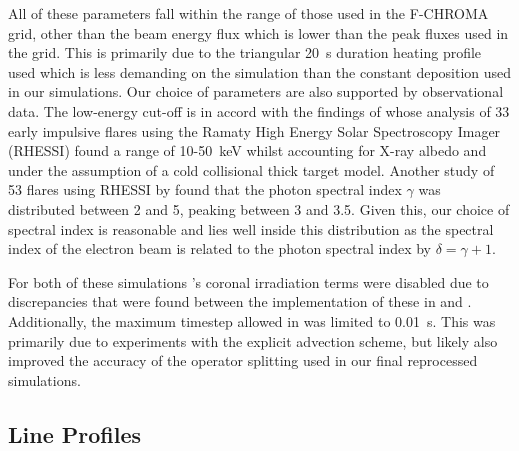 All of these parameters fall within the range of those used in the F-CHROMA grid, other than the beam energy flux which is lower than the peak fluxes used in the grid.
This is primarily due to the triangular \SI{20}{\second} duration heating profile used which is less demanding on the simulation than the constant deposition used in our simulations.
Our choice of parameters are also supported by observational data.
The low-energy cut-off is in accord with the findings of \citet{Sui2007} whose analysis of 33 early impulsive flares using the Ramaty High Energy Solar Spectroscopy Imager (RHESSI) found a range of 10-\SI{50}{\kilo\electronvolt} whilst accounting for X-ray albedo and under the assumption of a cold collisional thick target model.
Another study of 53 flares using RHESSI by \citet{Saint-Hilaire2008} found that the photon spectral index $\gamma$ was distributed between 2 and 5, peaking between 3 and 3.5.
Given this, our choice of spectral index is reasonable and lies well inside this distribution as the spectral index of the electron beam is related to the photon spectral index by $\delta = \gamma + 1$.

For both of these simulations \Radyn{}'s coronal irradiation terms were disabled due to discrepancies that were found between the implementation of these in \Radyn{} and \Lw{}.
Additionally, the maximum timestep allowed in \Radyn{} was limited to \SI{0.01}{\second}.
This was primarily due to experiments with the explicit advection scheme, but likely also improved the accuracy of the operator splitting used in our final reprocessed simulations.

\subsection{Line Profiles}\label{Sec:TimeDep8542Profiles}

